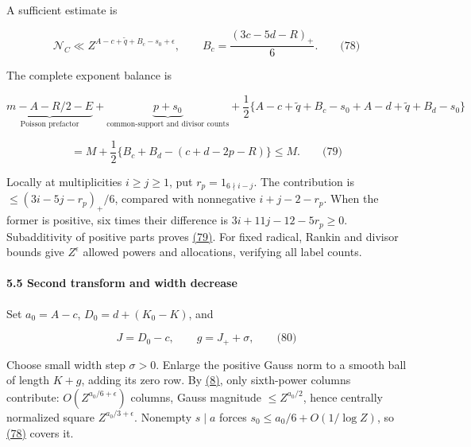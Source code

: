 A sufficient estimate is

\hypertarget{cf:eq:D.14}{}

\label{cf:eq:D.14}

\[
\mathcal N_C\ll Z^{A-c+\widetilde q+B_c-s_0+\epsilon},\qquad
B_c=\frac{(3c-5d-R)_+}{6}.
\qquad\text{(78)}
\]

The complete exponent balance is

\[
\underbrace{m-A-R/2-E}_{\text{Poisson prefactor}}
+\underbrace{p+s_0}_{\text{common-support and divisor counts}}
+\frac12\{A-c+\widetilde q+B_c-s_0+A-d+\widetilde q+B_d-s_0\}
\]

\hypertarget{cf:eq:D.15}{}

\label{cf:eq:D.15}

\[
=M+\frac12\{B_c+B_d-(c+d-2p-R)\}\le M.
\qquad\text{(79)}
\]

Locally at multiplicities \(i\ge j\ge1\), put \(r_p=1_{6\nmid i-j}\). The contribution is \(\le(3i-5j-r_p)_+/6\), compared with nonnegative \(i+j-2-r_p\). When the former is positive, six times their difference is \(3i+11j-12-5r_p\ge0\). Subadditivity of positive parts proves \protect\hyperlink{cf:eq:D.15}{(79)}. For fixed radical, Rankin and divisor bounds give \(Z^\epsilon\) allowed powers and allocations, verifying all label counts.

\hypertarget{cf:sec:D.5}{}

\label{cf:sec:D.5}

\hypertarget{second-transform-and-width-decrease}{%
\paragraph{5.5 Second transform and width decrease}\label{second-transform-and-width-decrease}}

Set \(a_0=A-c\), \(D_0=d+(K_0-K)\), and

\hypertarget{cf:eq:D.16}{}

\label{cf:eq:D.16}

\[
J=D_0-c,\qquad g=J_++\sigma,
\qquad\text{(80)}
\]

Choose small width step \(\sigma>0\). Enlarge the positive Gauss norm to a smooth ball of length \(K+g\), adding its zero row. By \protect\hyperlink{cf:eq:A.12}{(8)}, only sixth-power columns contribute: \(O(Z^{a_0/6+\epsilon})\) columns, Gauss magnitude \(\le Z^{a_0/2}\), hence centrally normalized square \(Z^{a_0/3+\epsilon}\). Nonempty \(s\mid a\) forces \(s_0\le a_0/6+O(1/\log Z)\), so \protect\hyperlink{cf:eq:D.14}{(78)} covers it.

